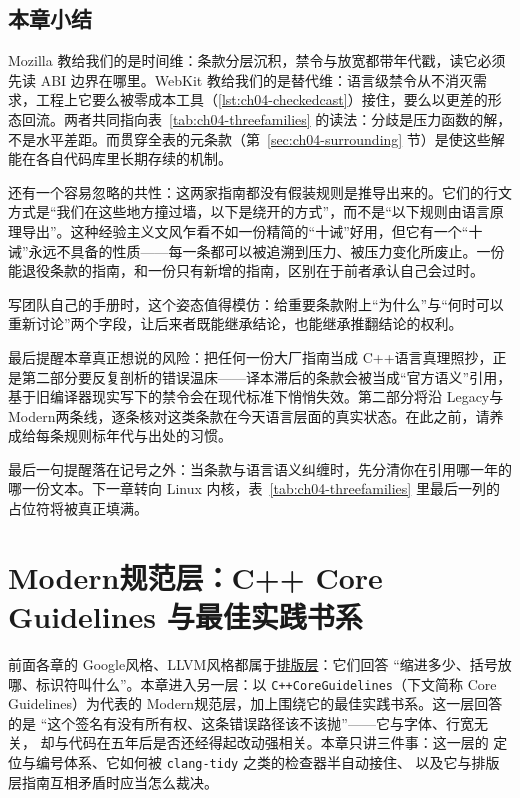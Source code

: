 \documentclass[12pt,a4paper,fontset=fandol]{ctexbook}
\newcommand{\Tp}[1]{\texttt{#1}}
\newcommand{\Bk}{\discretionary{}{}{}}
\newcommand{\Lang}[1]{\textsf{#1}}
\newcommand{\CPP}{\Lang{C++}}
\newcommand{\DomGo}{\Lang{Google}}
\newcommand{\DomLlvm}{\Lang{LLVM}}
\newcommand{\DomMod}{\Lang{Modern}}
\newcommand{\DomTra}{\Lang{Legacy}}
\begin{document}
\section{本章小结}
\label{sec:ch04-recap}

Mozilla 教给我们的是时间维：条款分层沉积，禁令与放宽都带年代戳，读它必须先读 ABI 边界在哪里。WebKit 教给我们的是替代维：语言级禁令从不消灭需求，工程上它要么被零成本工具（\ref{lst:ch04-checkedcast}）接住，要么以更差的形态回流。两者共同指向表~\ref{tab:ch04-threefamilies} 的读法：分歧是压力函数的解，不是水平差距。而贯穿全表的元条款（第~\ref{sec:ch04-surrounding} 节）是使这些解能在各自代码库里长期存续的机制。

还有一个容易忽略的共性：这两家指南都没有假装规则是推导出来的。它们的行文方式是``我们在这些地方撞过墙，以下是绕开的方式''，而不是``以下规则由语言原理导出''。这种经验主义文风乍看不如一份精简的``十诫''好用，但它有一个``十诫''永远不具备的性质——每一条都可以被追溯到压力、被压力变化所废止。一份能退役条款的指南，和一份只有新增的指南，区别在于前者承认自己会过时。

写团队自己的手册时，这个姿态值得模仿：给重要条款附上``为什么''与``何时可以重新讨论''两个字段，让后来者既能继承结论，也能继承推翻结论的权利。

\begin{note}[title={指南不是语言}]
最后提醒本章真正想说的风险：把任何一份大厂指南当成 \CPP 语言真理照抄，正是第二部分要反复剖析的错误温床——译本滞后的条款会被当成``官方语义''引用，基于旧编译器现实写下的禁令会在现代标准下悄悄失效。第二部分将沿 \DomTra 与 \DomMod 两条线，逐条核对这类条款在今天语言层面的真实状态。在此之前，请养成给每条规则标年代与出处的习惯。
\end{note}

最后一句提醒落在记号之外：当条款与语言语义纠缠时，先分清你在引用哪一年的哪一份文本。下一章转向 Linux 内核，表~\ref{tab:ch04-threefamilies} 里最后一列的占位符将被真正填满。


\chapter{\DomMod 规范层：C++ Core Guidelines 与最佳实践书系}
\label{ch:ch05-coreg}

前面各章的 \DomGo 风格、\DomLlvm 风格都属于\underline{排版层}：它们回答
``缩进多少、括号放哪、标识符叫什么''。本章进入另一层：以
\Tp{C++{\Bk}Core{\Bk}Guidelines}（下文简称 Core Guidelines）为代表的
\DomMod 规范层，加上围绕它的最佳实践书系。这一层回答的是
``这个签名有没有所有权、这条错误路径该不该抛''——它与字体、行宽无关，
却与代码在五年后是否还经得起改动强相关。本章只讲三件事：这一层的
定位与编号体系、它如何被 \Tp{clang-tidy} 之类的检查器半自动接住、
以及它与排版层指南互相矛盾时应当怎么裁决。
\end{document}
